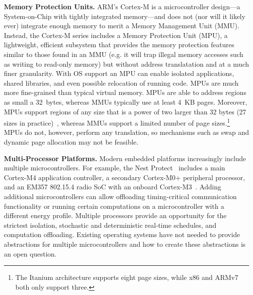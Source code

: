 {\bf Memory Protection Units.}
ARM's Cortex-M is a microcontroller design---a System-on-Chip with tightly
integrated memory---and does not (nor will it likely ever) integrate enough
memory to merit a Memory Management Unit (MMU). Instead, the Cortex-M series
includes a Memory Protection Unit (MPU), a lightweight, efficient subsystem
that provides the memory protection features similar to those found in an MMU
(e.g. it will trap illegal memory accesses such as writing to read-only memory)
but without address translatation and at a much finer granularity.
With OS support an MPU can enable isolated applications, shared libraries, and
even possible relocation of running code.
MPUs are much more fine-grained than typical virtual memory. MPUs are able to
address regions as small a 32~bytes, whereas MMUs typically use at least 4~KB
pages. Moreover, MPUs support regions of any size that is a power of two larger
than 32 bytes (27 sizes in practice)~\cite{cortexm4-ug:ch4.5}, whereas MMUs
support a limited number of page sizes.\footnote{The Itanium architecture
supports eight page sizes, while x86 and ARMv7 both only support three.}
MPUs do not, however, perform any translation, so mechanisms such as swap and
dynamic page allocation may not be feasible.

{\bf Multi-Processor Platforms.}
Modern embedded platforms increasingly include multiple microcontrollers. For
example, the Nest Protect~\cite{nest-protect} includes a main Cortex-M4 application controller, a
secondary Cortex-M0+ peripheral processor, and an EM357 802.15.4 radio SoC with
an onboard Cortex-M3~\cite{nestprotect-teardown}. Adding additional
microcontrollers can allow offloading timing-critical communication
functionality or running certain computations on a microcontroller with a
different energy profile. Multiple processors provide an opportunity for the
strictest isolation, stochastic and deterministic real-time schedules, and
computation offloading.
Existing operating systems have not needed to provide abstractions for multiple
microcontrollers and how to create these abstractions is an open question.



